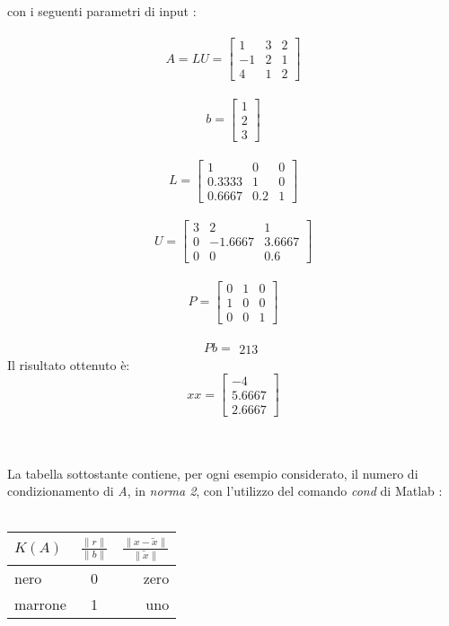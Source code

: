 \begin{description}
	con i seguenti parametri di input :\\\	  
	\[
	A = LU =\begin{bmatrix}
		1  & 3 & 2 \\ 
		-1 & 2 & 1 \\
		4  & 1 & 2 
	\end{bmatrix}
	\]\\
	\[
	b =\begin{bmatrix}
		1 \\
		2 \\
		3 
	\end{bmatrix}
	\]\\
	\[
	L =\begin{bmatrix}
		   1   &  0  & 0 \\ 
		0.3333 &  1  & 0 \\
		0.6667 & 0.2 & 1 
	\end{bmatrix}
	\]\\ 
	\[
	U =\begin{bmatrix}
		3 &    2    &    1   \\ 
		0 & -1.6667 & 3.6667 \\
		0 &    0    &   0.6 
	\end{bmatrix}
	\]\\ 
	\[
	P =\begin{bmatrix}
		0 & 1 & 0 \\ 
		1 & 0 & 0 \\
		0 & 0 & 1 
	\end{bmatrix}
	\]\\
	\[
	Pb =\begin{matrix}
		2
		1
		3
	\end{matrix}
	\]
	Il risultato ottenuto è:\\
	\[
	xx =\begin{bmatrix}
		  -4   \\
		5.6667 \\
		2.6667 
	\end{bmatrix}
	\]\\\\
\end{description}
La tabella sottostante contiene, per ogni esempio considerato, il numero di condizionamento di \textit{A}, in \textit{norma 2}, con l'utilizzo del comando \textit{cond} di Matlab :\\\
\begin{center}
\begin{tabular}{ | l | c | r | }
	\hline
	$K(A)$    & $\frac{\|r\|}{\|b\|}$ & $\frac{\|x-\tilde{x}\|}{\|\tilde{x}\|}$ \\
	\hline
	nero    & 0           & zero                                          \\
	marrone & 1           & uno                                           \\
	\hline
\end{tabular}
\end{center}